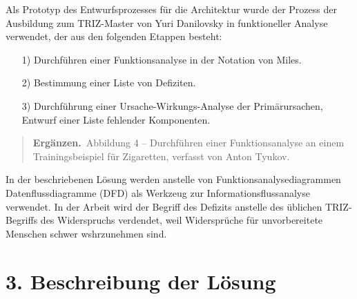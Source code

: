 \documentclass[11pt,a4paper]{article}
\newcommand{\ergaenzen}{\textbf{Ergänzen.}\ }
\begin{document}
Als Prototyp des Entwurfsprozesses für die Architektur wurde der Prozess der
Ausbildung zum TRIZ-Master von Yuri Danilovsky in funktioneller Analyse
verwendet, der aus den folgenden Etappen besteht:
\begin{itemize}
\item[1)] Durchführen einer Funktionsanalyse in der Notation von Miles.
\item[2)] Bestimmung einer Liste von Defiziten.
\item[3)] Durchführung einer Ursache-Wirkungs-Analyse der Primärursachen,
  Entwurf einer Liste fehlender Komponenten.
\end{itemize}
\begin{quote}
  \ergaenzen Abbildung 4 -- Durchführen einer Funktionsanalyse an einem
  Trainingsbeispiel für Zigaretten, verfasst von Anton Tyukov.
\end{quote}
In der beschriebenen Lösung werden anstelle von Funktionsanalysediagrammen
Datenflussdiagramme (DFD) als Werkzeug zur Informationsflussanalyse verwendet.
In der Arbeit wird der Begriff des Defizits anstelle des üblichen
TRIZ-Begriffs des Widerspruchs verdendet, weil Widersprüche für unvorbereitete
Menschen schwer wshrzunehmen sind.

\section*{3. Beschreibung der Lösung}
\end{document}
